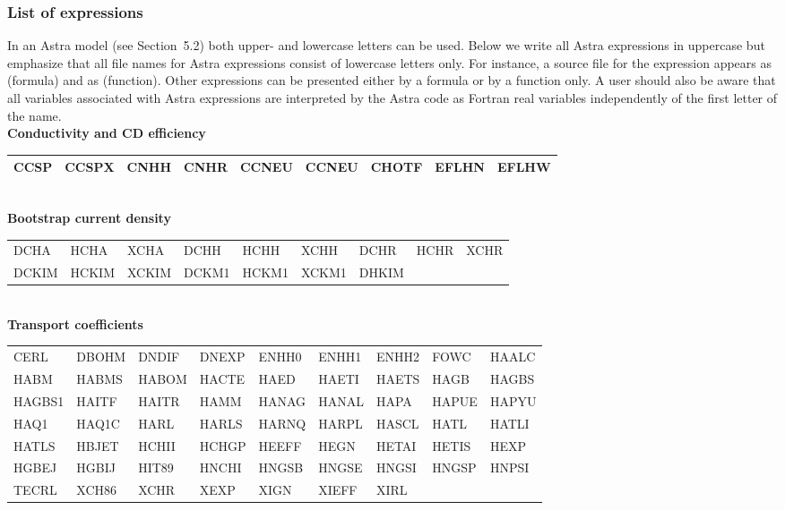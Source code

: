 \subsubsection{List of expressions}

In an Astra model (see Section~5.2) both upper- and lowercase letters can
be used. 
Below we write all Astra expressions in uppercase but emphasize that 
all file names for Astra expressions consist of lowercase letters only.
For instance, a source file for the expression  appears as 
 (formula) and as  (function).
Other expressions can be presented either by a formula or by a function
only. 
A user should also be aware that all variables associated with Astra
expressions are interpreted by the Astra code as Fortran real variables
independently of the first letter of the name.  
\smallskip\\
\noindent
{\bf Conductivity and CD efficiency}\\[1ex]
{\tt\begin{tabular}
{|p{13mm}p{13mm}p{13mm}p{13mm}p{13mm}p{13mm}p{13mm}p{13mm}p{13mm}|}\hline
CCSP & CCSPX & CNHH & CNHR & CCNEU & CCNEU & CHOTF & EFLHN & EFLHW\\ 
\hline
\end{tabular}}
\smallskip\\
\noindent
{\bf Bootstrap current density}\nopagebreak\\[1ex]
{\tt\begin{tabular}
{|p{13mm}p{13mm}p{13mm}p{13mm}p{13mm}p{13mm}p{13mm}p{13mm}p{13mm}|}
\hline
DCHA	& HCHA	& XCHA	& DCHH	& HCHH	& XCHH	& DCHR	& HCHR	& XCHR	\\
DCKIM	& HCKIM	& XCKIM	& DCKM1	& HCKM1	& XCKM1	& DHKIM	&	& \\
\hline
\end{tabular}}
\bigskip
\\
\noindent
{\bf Transport coefficients}\\[1ex]
{\tt\begin{tabular}
{|p{13mm}p{13mm}p{13mm}p{13mm}p{13mm}p{13mm}p{13mm}p{13mm}p{13mm}|}
\hline
CERL	& DBOHM	& DNDIF	& DNEXP	& ENHH0	& ENHH1	& ENHH2	& FOWC	& HAALC	\\
HABM	& HABMS	& HABOM	& HACTE	& HAED	& HAETI	& HAETS	& HAGB	& HAGBS	\\
HAGBS1	& HAITF	& HAITR	& HAMM	& HANAG	& HANAL	& HAPA	& HAPUE	& HAPYU	\\
HAQ1	& HAQ1C	& HARL	& HARLS	& HARNQ	& HARPL	& HASCL	& HATL	& HATLI	\\
HATLS	& HBJET	& HCHII	& HCHGP	& HEEFF	& HEGN 	& HETAI	& HETIS	& HEXP	\\
HGBEJ	& HGBIJ	& HIT89	& HNCHI	& HNGSB	& HNGSE	& HNGSI	& HNGSP	& HNPSI	\\
TECRL	& XCH86	& XCHR	& XEXP	& XIGN	& XIEFF	& XIRL	&	& \\ 
\hline
\end{tabular}}
